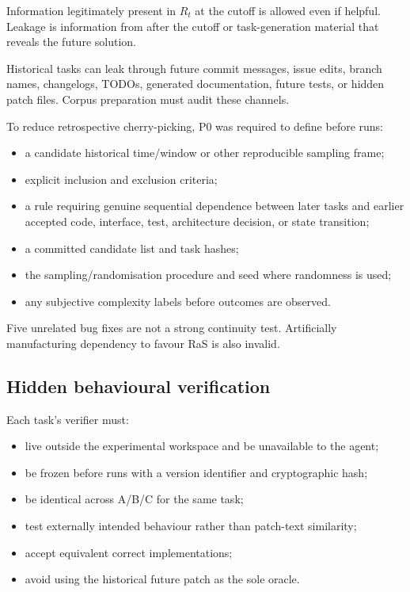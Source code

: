 Information legitimately present in $R_t$ at the cutoff is allowed even if helpful. Leakage is information from after the cutoff or task-generation material that reveals the future solution.

Historical tasks can leak through future commit messages, issue edits, branch names, changelogs, TODOs, generated documentation, future tests, or hidden patch files. Corpus preparation must audit these channels.

To reduce retrospective cherry-picking, P0 was required to define before runs:
\begin{itemize}
    \item a candidate historical time/window or other reproducible sampling frame;
    \item explicit inclusion and exclusion criteria;
    \item a rule requiring genuine sequential dependence between later tasks and earlier accepted code, interface, test, architecture decision, or state transition;
    \item a committed candidate list and task hashes;
    \item the sampling/randomisation procedure and seed where randomness is used;
    \item any subjective complexity labels before outcomes are observed.
\end{itemize}

Five unrelated bug fixes are not a strong continuity test. Artificially manufacturing dependency to favour RaS is also invalid.

\subsection{Hidden behavioural verification}

Each task's verifier must:
\begin{itemize}
    \item live outside the experimental workspace and be unavailable to the agent;
    \item be frozen before runs with a version identifier and cryptographic hash;
    \item be identical across A/B/C for the same task;
    \item test externally intended behaviour rather than patch-text similarity;
    \item accept equivalent correct implementations;
    \item avoid using the historical future patch as the sole oracle.
\end{itemize}

